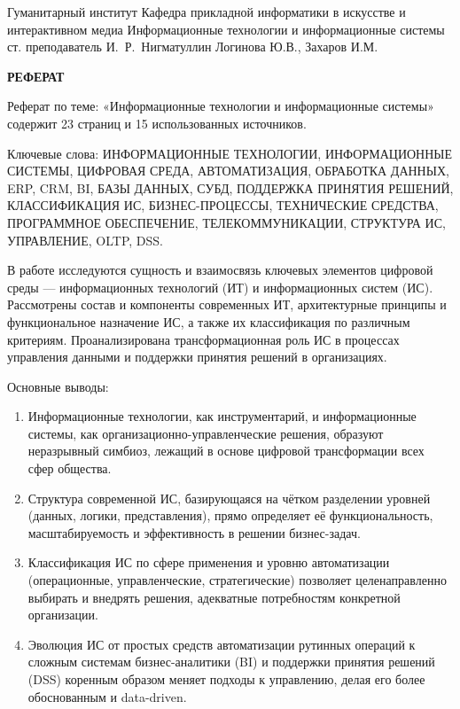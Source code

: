 \documentclass{SibFU-docs}
\begin{document}
\renewcommand{\contentsname}{}
\mycovertitle
{Гуманитарный институт}
{Кафедра прикладной информатики в искусстве и интерактивном медиа}
{Информационные технологии и информационные системы}
{ст. преподаватель И.~Р.~Нигматуллин}
{Логинова Ю.В., Захаров И.М.}
 
\begin{center}
\bfseries РЕФЕРАТ
\end{center}
\noindent

Реферат по теме: «Информационные технологии и информационные системы» содержит 23 страниц и 15 использованных источников.

Ключевые слова: ИНФОРМАЦИОННЫЕ ТЕХНОЛОГИИ, ИНФОРМАЦИОННЫЕ СИСТЕМЫ, ЦИФРОВАЯ СРЕДА, АВТОМАТИЗАЦИЯ, ОБРАБОТКА ДАННЫХ, ERP, CRM, BI, БАЗЫ ДАННЫХ, СУБД, ПОДДЕРЖКА ПРИНЯТИЯ РЕШЕНИЙ, КЛАССИФИКАЦИЯ ИС, БИЗНЕС-ПРОЦЕССЫ, ТЕХНИЧЕСКИЕ СРЕДСТВА, ПРОГРАММНОЕ ОБЕСПЕЧЕНИЕ, ТЕЛЕКОММУНИКАЦИИ, СТРУКТУРА ИС, УПРАВЛЕНИЕ, OLTP, DSS.

В работе исследуются сущность и взаимосвязь ключевых элементов цифровой среды — информационных технологий (ИТ) и информационных систем (ИС). Рассмотрены состав и компоненты современных ИТ, архитектурные принципы и функциональное назначение ИС, а также их классификация по различным критериям. Проанализирована трансформационная роль ИС в процессах управления данными и поддержки принятия решений в организациях.

Основные выводы:

\begin{enumerate}
\item Информационные технологии, как инструментарий, и информационные системы, как организационно-управленческие решения, образуют неразрывный симбиоз, лежащий в основе цифровой трансформации всех сфер общества.

\item Структура современной ИС, базирующаяся на чётком разделении уровней (данных, логики, представления), прямо определяет её функциональность, масштабируемость и эффективность в решении бизнес-задач.

\item Классификация ИС по сфере применения и уровню автоматизации (операционные, управленческие, стратегические) позволяет целенаправленно выбирать и внедрять решения, адекватные потребностям конкретной организации.

\item Эволюция ИС от простых средств автоматизации рутинных операций к сложным системам бизнес-аналитики (BI) и поддержки принятия решений (DSS) коренным образом меняет подходы к управлению, делая его более обоснованным и data-driven.
\end{enumerate}
\end{document}

